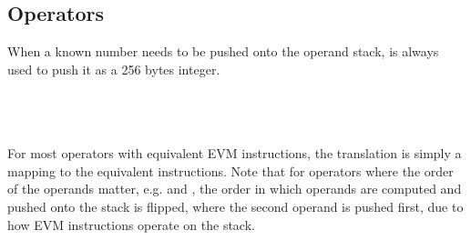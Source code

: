 \subsection{Operators}
When a known number needs to be pushed onto the operand stack,  is always used to push it as a 256 bytes integer. \\\\
\begin{prooftree}
\end{prooftree}\\\\
For most operators with equivalent EVM instructions, the translation is simply a mapping to the equivalent instructions. Note that for operators where the order of the operands matter, e.g. \code{-} and \code{<}, the order in which operands are computed and pushed onto the stack is flipped, where the second operand is pushed first, due to how EVM instructions operate on the stack. \\\\
\begin{prooftree}
\end{prooftree}\qquad
\begin{prooftree}
\end{prooftree}\qquad
\begin{prooftree}
\end{prooftree}\\\\\\
\begin{prooftree}
\end{prooftree}\qquad
\begin{prooftree}
\end{prooftree}\qquad
\begin{prooftree}
\end{prooftree} \\\\\\
